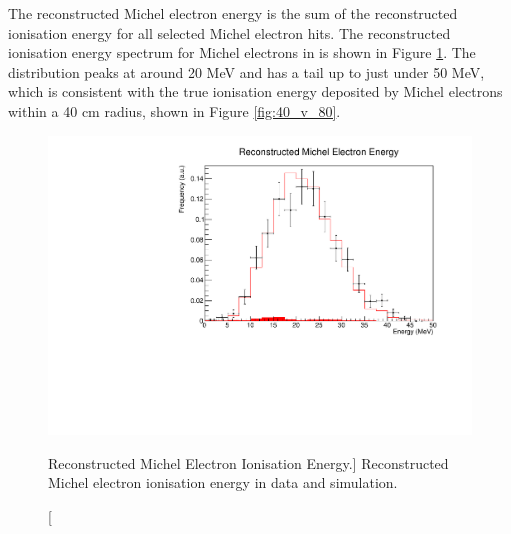 The reconstructed Michel electron energy is the sum of the reconstructed
ionisation energy for all selected Michel electron hits. The reconstructed 
ionisation energy spectrum for Michel electrons in \protodune{} is shown in 
Figure \ref{fig:michel_ion_reco}. The distribution peaks at around 20 MeV and 
has a tail up to just under 50 MeV, which is consistent with the true 
ionisation energy deposited by Michel electrons within a 40 cm radius, shown 
in Figure \ref{fig:40_v_80}.
\begin{figure}
	\centering
	\includegraphics[width=\textwidth]{figures/michel_ion_reco.pdf}
	\caption
	[Reconstructed Michel Electron Ionisation Energy.]
	{Reconstructed Michel electron ionisation energy in data and simulation.}
	\label{fig:michel_ion_reco}
\end{figure}


